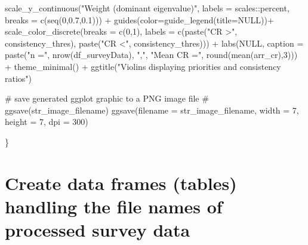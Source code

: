 \documentclass[
]{article}
\newenvironment{Shaded}{\begin{snugshade}}{\end{snugshade}}
\newcommand{\AttributeTok}[1]{\textcolor[rgb]{0.00,0.34,0.68}{#1}}
\newcommand{\CommentTok}[1]{\textcolor[rgb]{0.54,0.53,0.53}{#1}}
\newcommand{\ConstantTok}[1]{\textcolor[rgb]{0.67,0.33,0.00}{#1}}
\newcommand{\DecValTok}[1]{\textcolor[rgb]{0.69,0.50,0.00}{#1}}
\newcommand{\FloatTok}[1]{\textcolor[rgb]{0.69,0.50,0.00}{#1}}
\newcommand{\FunctionTok}[1]{\textcolor[rgb]{0.39,0.29,0.61}{#1}}
\newcommand{\NormalTok}[1]{\textcolor[rgb]{0.12,0.11,0.11}{#1}}
\newcommand{\SpecialCharTok}[1]{\textcolor[rgb]{0.24,0.68,0.91}{#1}}
\newcommand{\StringTok}[1]{\textcolor[rgb]{0.75,0.01,0.01}{#1}}
\begin{document}
\begin{Shaded}
\begin{Highlighting}[]
  \FunctionTok{scale\_y\_continuous}\NormalTok{(}\StringTok{"Weight (dominant eigenvalue)"}\NormalTok{, }
                     \AttributeTok{labels =}\NormalTok{ scales}\SpecialCharTok{::}\NormalTok{percent, }
                     \AttributeTok{breaks =} \FunctionTok{c}\NormalTok{(}\FunctionTok{seq}\NormalTok{(}\DecValTok{0}\NormalTok{,}\FloatTok{0.7}\NormalTok{,}\FloatTok{0.1}\NormalTok{))) }\SpecialCharTok{+}
  \FunctionTok{guides}\NormalTok{(}\AttributeTok{color=}\FunctionTok{guide\_legend}\NormalTok{(}\AttributeTok{title=}\ConstantTok{NULL}\NormalTok{))}\SpecialCharTok{+}
  \FunctionTok{scale\_color\_discrete}\NormalTok{(}\AttributeTok{breaks =} \FunctionTok{c}\NormalTok{(}\DecValTok{0}\NormalTok{,}\DecValTok{1}\NormalTok{), }
                       \AttributeTok{labels =} \FunctionTok{c}\NormalTok{(}\FunctionTok{paste}\NormalTok{(}\StringTok{"CR \textgreater{}"}\NormalTok{, consistency\_thres), }
                                  \FunctionTok{paste}\NormalTok{(}\StringTok{"CR \textless{}"}\NormalTok{, consistency\_thres))) }\SpecialCharTok{+}
  \FunctionTok{labs}\NormalTok{(}\ConstantTok{NULL}\NormalTok{, }\AttributeTok{caption =} \FunctionTok{paste}\NormalTok{(}\StringTok{"n ="}\NormalTok{, }\FunctionTok{nrow}\NormalTok{(df\_surveyData), }\StringTok{","}\NormalTok{, }\StringTok{"Mean CR ="}\NormalTok{,}
                           \FunctionTok{round}\NormalTok{(}\FunctionTok{mean}\NormalTok{(arr\_cr),}\DecValTok{3}\NormalTok{))) }\SpecialCharTok{+}
  \FunctionTok{theme\_minimal}\NormalTok{() }\SpecialCharTok{+}
  \FunctionTok{ggtitle}\NormalTok{(}\StringTok{"Violins displaying priorities and consistency ratios"}\NormalTok{)}
  
  \CommentTok{\# save generated ggplot graphic to a PNG image file}
  \CommentTok{\# ggsave(str\_image\_filename)}
  \FunctionTok{ggsave}\NormalTok{(}\AttributeTok{filename =}\NormalTok{ str\_image\_filename, }\AttributeTok{width =} \DecValTok{7}\NormalTok{, }\AttributeTok{height =} \DecValTok{7}\NormalTok{, }\AttributeTok{dpi =} \DecValTok{300}\NormalTok{)}

\NormalTok{\}}
\end{Highlighting}
\end{Shaded}

\hypertarget{create-data-frames-tables-handling-the-file-names-of-processed-survey-data}{%
\section{Create data frames (tables) handling the file names of
processed survey
data}\label{create-data-frames-tables-handling-the-file-names-of-processed-survey-data}}
\end{document}
